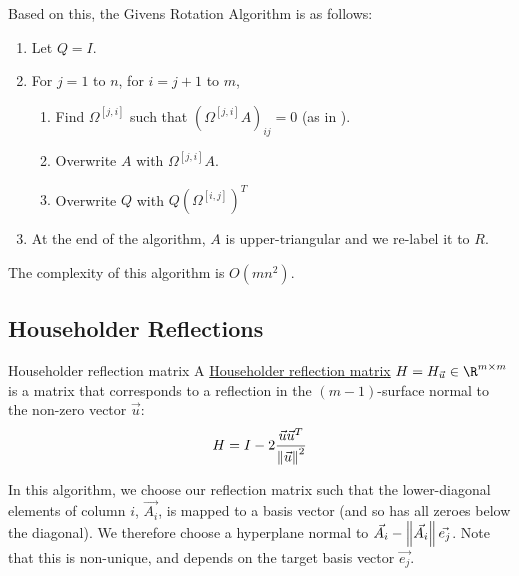 \documentclass[../Main.tex]{subfiles}
\begin{document}
Based on this, the Givens Rotation Algorithm is as follows:
\begin{enumerate}
    \item Let $Q = I$.
    \item For $j = 1$ to $n$, for $i = j+1$ to $m$,
    \begin{enumerate}
        \item Find $\Omega^{[j,i]}$ such that $\left(\Omega^{[j,i]}A\right)_{ij} = 0$ (as in ).
        \item Overwrite $A$ with $\Omega^{[j,i]}A$.
        \item Overwrite $Q$ with $Q\left(\Omega^{[i,j]}\right)^T$
    \end{enumerate}
    \item At the end of the algorithm, $A$ is upper-triangular and we re-label it to $R$.
\end{enumerate}
\begin{remark}
    The complexity of this algorithm is $O(mn^2)$.
\end{remark}
\subsection{Householder Reflections}
\begin{definition}{Householder reflection matrix}
    A \underline{Householder reflection matrix} $H = H_{\vec{u}} \in \R^{m \times m}$ is a matrix that corresponds to a reflection in the $(m-1)$-surface normal to the non-zero vector $\vec{u}$:
    \begin{equation*}
        H = I - 2 \frac{\vec{u} \vec{u}^T}{\left\|\vec{u}\right\|^2}
    \end{equation*}
\end{definition}

In this algorithm, we choose our reflection matrix such that the lower-diagonal elements of column $i$, $\vec{A_i}$, is mapped to a basis vector (and so has all zeroes below the diagonal). We therefore choose a hyperplane normal to $\vec{A_i} - \left\|\vec{A_i}\right\|\vec{e_j}$. Note that this is non-unique, and depends on the target basis vector $\vec{e_j}$.
\end{document}

